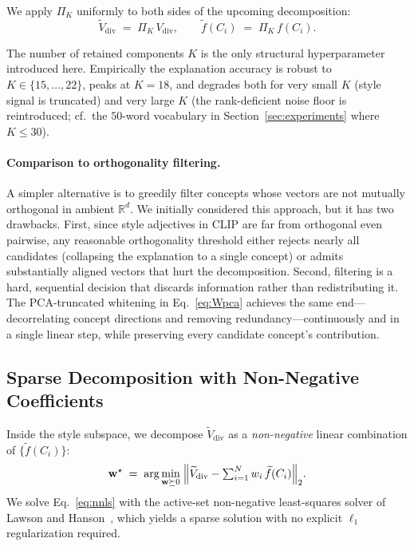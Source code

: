 We apply $\Pi_K$ uniformly to both sides of the upcoming decomposition:
\begin{equation}
\widetilde{V}_{\mathrm{div}} \;=\; \Pi_K\, V_{\mathrm{div}},
\qquad
\widetilde{f}(C_i) \;=\; \Pi_K\, f(C_i).
\end{equation}

The number of retained components $K$ is the only structural hyperparameter
introduced here. Empirically the explanation accuracy is robust to
$K\!\in\!\{15,\dots,22\}$, peaks at $K{=}18$, and degrades both for very
small $K$ (style signal is truncated) and very large $K$ (the rank-deficient
noise floor is reintroduced; cf.\ the $50$-word vocabulary in
Section~\ref{sec:experiments} where $K \le 30$).

\paragraph{Comparison to orthogonality filtering.}
A simpler alternative is to greedily filter concepts whose vectors are not
mutually orthogonal in ambient $\mathbb{R}^d$. We initially considered this
approach, but it has two drawbacks. First, since style adjectives in CLIP
are far from orthogonal even pairwise, any reasonable orthogonality
threshold either rejects nearly all candidates (collapsing the explanation
to a single concept) or admits substantially aligned vectors that hurt the
decomposition. Second, filtering is a hard, sequential decision that
discards information rather than redistributing it. The PCA-truncated
whitening in Eq.~\eqref{eq:Wpca} achieves the same end---decorrelating
concept directions and removing redundancy---continuously and in a single
linear step, while preserving every candidate concept's contribution.

\subsection{Sparse Decomposition with Non-Negative Coefficients}
\label{sec:decompose}

Inside the style subspace, we decompose $\widetilde{V}_{\mathrm{div}}$ as a
\emph{non-negative} linear combination of $\{\widetilde{f}(C_i)\}$:
\begin{equation}
\label{eq:nnls}
\mathbf{w}^\star \;=\;
\arg\min_{\mathbf{w}\succeq 0}\;
\Bigl\|\widetilde{V}_{\mathrm{div}}
- \textstyle\sum_{i=1}^{N} w_i\,\widetilde{f}(C_i)\Bigr\|_2.
\end{equation}
We solve Eq.~\eqref{eq:nnls} with the active-set non-negative least-squares
solver of Lawson and Hanson~\cite{lawson1995solving}, which yields a sparse
solution with no explicit $\ell_1$ regularization required.

